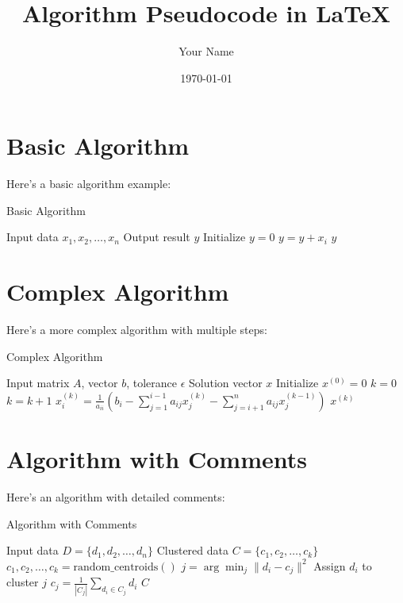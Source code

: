 \documentclass{article}
\title{Algorithm Pseudocode in LaTeX}
\author{Your Name}
\date{\today}
\begin{document}
\maketitle

\section{Basic Algorithm}
Here's a basic algorithm example:

\begin{algorithm}
\caption{Basic Algorithm}
\label{alg:basic}
\begin{algorithmic}[1]
\REQUIRE Input data $x_1, x_2, \ldots, x_n$
\ENSURE Output result $y$
\STATE Initialize $y = 0$
    \STATE $y = y + x_i$
\ENDFOR
\RETURN $y$
\end{algorithmic}
\end{algorithm}

\section{Complex Algorithm}
Here's a more complex algorithm with multiple steps:

\begin{algorithm}
\caption{Complex Algorithm}
\label{alg:complex}
\begin{algorithmic}[1]
\REQUIRE Input matrix $A$, vector $b$, tolerance $\epsilon$
\ENSURE Solution vector $x$
\STATE Initialize $x^{(0)} = 0$
\STATE $k = 0$
\REPEAT
    \STATE $k = k + 1$
        \STATE $x_i^{(k)} = \frac{1}{a_{ii}}\left(b_i - \sum_{j=1}^{i-1} a_{ij}x_j^{(k)} - \sum_{j=i+1}^{n} a_{ij}x_j^{(k-1)}\right)$
    \ENDFOR
{}
\RETURN $x^{(k)}$
\end{algorithmic}
\end{algorithm}

\section{Algorithm with Comments}
Here's an algorithm with detailed comments:

\begin{algorithm}
\caption{Algorithm with Comments}
\label{alg:comments}
\begin{algorithmic}[1]
\REQUIRE Input data $D = \{d_1, d_2, \ldots, d_n\}$
\ENSURE Clustered data $C = \{c_1, c_2, \ldots, c_k\}$
\STATE {}
\STATE $c_1, c_2, \ldots, c_k = \text{random\_centroids}()$
\STATE {}
\REPEAT
    \STATE {}
        \STATE $j = \arg\min_{j} \|d_i - c_j\|^2$
        \STATE Assign $d_i$ to cluster $j$
    \ENDFOR
    \STATE {}
        \STATE $c_j = \frac{1}{|C_j|} \sum_{d_i \in C_j} d_i$
    \ENDFOR
{}
\RETURN $C$
\end{algorithmic}
\end{algorithm}
\end{document}

